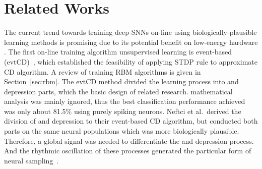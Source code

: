 \section{Related Works}
\DIFaddbegin \label{sec:SRM_related}
\DIFaddend %
The current trend towards training deep SNNs on-line using biologically-plausible learning methods is promising due to its potential benefit on low-energy hardware \DIFdelbegin {}\DIFdelend \DIFaddbegin {}\DIFaddend .
The first on-line training algorithm \DIFdelbegin {}\DIFdelend \DIFaddbegin {}\DIFaddend unsupervised learning is event-based \DIFdelbegin {}\DIFdelend \DIFaddbegin {}\DIFaddend (evtCD)~\DIFdelbegin {}\DIFdelend \DIFaddbegin {}\DIFaddend , which established the feasibility of applying \DIFaddbegin {}\DIFaddend STDP rule to \DIFaddbegin {}\DIFaddend approximate CD algorithm.
A review of training \DIFaddbegin {}\DIFaddend RBM algorithms is given in Section~\ref{sec:rbm}.
The evtCD method divided the learning process into \DIFdelbegin {}\DIFdelend \DIFaddbegin {}\DIFaddend and depression parts, which \DIFdelbegin {}\DIFdelend \DIFaddbegin {}\DIFaddend the basic design of related research.
\DIFdelbegin {}\DIFdelend \DIFaddbegin {}\DIFaddend mathematical analysis was mainly ignored, thus the best classification performance achieved was only about 81.5\% using purely spiking neurons.
Neftci et al.~\DIFdelbegin {}\DIFdelend \DIFaddbegin {}\DIFaddend derived the division of \DIFdelbegin {}\DIFdelend \DIFaddbegin {}\DIFaddend and depression to their event-based CD algorithm, but conducted both parts on the same neural populations which was more biologically plausible.
Therefore, a global signal was needed to differentiate the \DIFdelbegin {}\DIFdelend \DIFaddbegin {}\DIFaddend and depression process.
And the rhythmic oscillation of these processes generated the particular form of neural sampling~\DIFdelbegin {}\DIFdelend \DIFaddbegin {}\DIFaddend .
